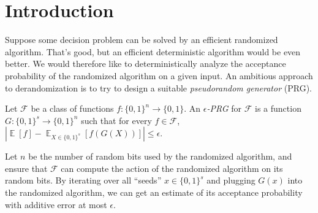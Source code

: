 \documentclass{toc}
\DeclareMathOperator*{\ExpVal}{\mathbb{E}}
\begin{document}
\begin{frontmatter}
\begin{abstract}
Finally, we investigate the limits of this line of work. Perhaps the strongest reduction along these lines one could hope for would say that for every explicit hitting set generator, there is an explicit PRG with similar parameters. In the setting of constant-width ROBPs over a large alphabet, we prove that establishing such a strong reduction is at least as difficult as constructing a good PRG outright. Quantitatively, we prove that if the strong reduction holds, then for every constant $\alpha > 0$, there is an explicit PRG for constant-width ROBPs with seed length $O(\log^{1 + \alpha} n)$. Along the way, unconditionally, we construct an improved hitting set for ROBPs over a large alphabet.
\end{abstract}

%

\end{frontmatter}

%
%
%
	 	
\section{Introduction} \label{sec:intro}
Suppose some decision problem can be solved by an efficient randomized algorithm. That's good, but an efficient deterministic algorithm would be even better. We would therefore like to deterministically analyze the acceptance probability of the randomized algorithm on a given input. An ambitious approach to derandomization is to try to design a suitable \emph{pseudorandom generator} (PRG).
\begin{definition}
Let $\mathcal{F}$ be a class of functions $f \colon \{0, 1\}^n \to \{0, 1\}$. An \emph{$\epsilon$-PRG} for $\mathcal{F}$ is a function $G \colon \{0, 1\}^s \to \{0, 1\}^n$ such that for every $f \in \mathcal{F}$,
$
\left|\ExpVal[f] - \ExpVal_{X \in \{0, 1\}^s}[f(G(X))]\right| \leq \epsilon.
$
\end{definition}
Let $n$ be the number of random bits used by the randomized algorithm, and ensure that $\mathcal{F}$ can compute the action of the randomized algorithm on its random bits. By iterating over all ``seeds'' $x \in \{0, 1\}^s$ and plugging $G(x)$ into the randomized algorithm, we can get an estimate of its acceptance probability with additive error at most $\epsilon$.
\end{document}
